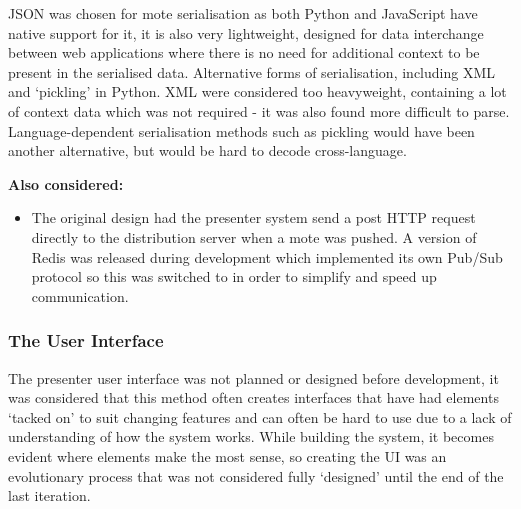 \documentclass[a4papert,11pt,notitlepage]{ltxdoc}
\begin{document}
JSON was chosen for mote serialisation as both Python and JavaScript have native support for it, it is also very lightweight, designed for data interchange between web applications where there is no need for additional context to be present in the serialised data. Alternative forms of serialisation, including XML and `pickling' in Python. XML were considered too heavyweight, containing a lot of context data which was not required - it was also found more difficult to parse. Language-dependent serialisation methods such as pickling would have been another alternative, but would be hard to decode cross-language.

\textbf{Also considered:}
\begin{itemize}
\item The original design had the presenter system send a post HTTP request directly to the distribution server when a mote was pushed. A version of Redis was released during development which implemented its own Pub/Sub protocol so this was switched to in order to simplify and speed up communication.
\end{itemize}

\subsubsection{The User Interface}
The presenter user interface was not planned or designed before development, it was considered that this method often creates interfaces that have had elements `tacked on' to suit changing features and can often be hard to use due to a lack of understanding of how the system works. While building the system, it becomes evident where elements make the most sense, so creating the UI was an evolutionary process that was not considered fully `designed' until the end of the last iteration.
\end{document}
